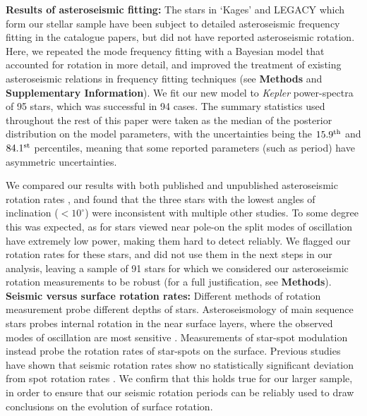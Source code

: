 \documentclass[12pt]{article}
\newcommand{\kepler}{\emph{Kepler}\xspace}
\begin{document}
\textbf{Results of asteroseismic fitting:} The stars in `Kages' and LEGACY which form our stellar sample have been subject to detailed asteroseismic frequency fitting in the catalogue papers, but did not have reported asteroseismic rotation. Here, we repeated the mode frequency fitting with a Bayesian model that accounted for rotation in more detail, and improved the treatment of existing asteroseismic relations in frequency fitting techniques (see \textbf{Methods} and \textbf{Supplementary Information}). We fit our new model to \kepler power-spectra of 95 stars, which was successful in 94 cases. The summary statistics used throughout the rest of this paper were taken as the median of the posterior distribution on the model parameters, with the uncertainties being the $15.9^{\rm th}$ and $84.1^{\rm st}$ percentiles, meaning that some reported parameters (such as period) have asymmetric uncertainties.

We compared our results with both published and unpublished asteroseismic rotation rates \cite{davies+2016, lund+2017,davies+2015, nielsen+2015, benomar+2018}, and found that the three stars with the lowest angles of inclination ($< 10^\circ$) were inconsistent with multiple other studies. To some degree this was expected, as  for stars viewed near pole-on the split modes of oscillation have extremely low power, making them hard to detect reliably. We flagged our rotation rates for these stars, and did not use them in the next steps in our analysis, leaving a sample of 91 stars for which we considered our asteroseismic rotation measurements to be robust (for a full justification, see \textbf{Methods}).\\

\textbf{Seismic versus surface rotation rates:} Different methods of rotation measurement probe different depths of stars. Asteroseismology of main sequence stars probes internal rotation in the near surface layers, where the observed modes of oscillation are most sensitive \cite{lund+2014}. Measurements of star-spot modulation instead probe the rotation rates of star-spots on the surface. Previous studies have shown that seismic rotation rates show no statistically significant deviation from spot rotation rates \cite{nielsen+2015, benomar+2015}. We confirm that this holds true for our larger sample, in order to ensure that our seismic rotation periods can be reliably used to draw conclusions on the evolution of surface rotation.
\end{document}
